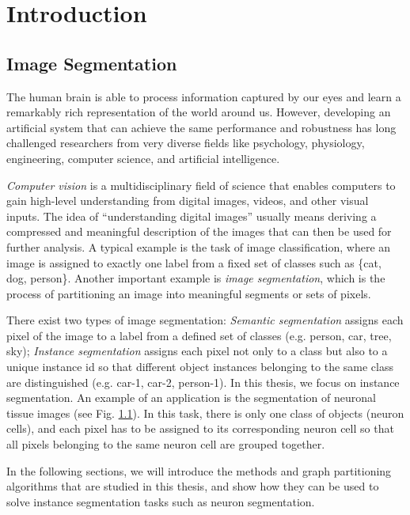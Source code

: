 
\chapter{Introduction}

\section{Image Segmentation}
The human brain is able to process information captured by our eyes and learn a remarkably rich representation of the world around us. However, developing an artificial system that can achieve the same performance and robustness has long challenged researchers from very diverse fields like psychology, physiology, engineering, computer science, and artificial intelligence.

\emph{Computer vision} is a multidisciplinary field of science that enables computers to gain high-level understanding from digital images, videos, and other visual inputs. 
The idea of ``understanding digital images'' usually means deriving a compressed and meaningful description of the images that can then be used for further analysis.
A typical example is the task of image classification, where an image is assigned to exactly one label from a fixed set of classes such as \{cat, dog, person\}. 
Another important example is \emph{image segmentation}, which is the process of partitioning an image into meaningful segments or sets of pixels. 

There exist two types of image segmentation: \emph{Semantic segmentation} assigns each pixel of the image to a label from a defined set of classes (e.g. person, car, tree, sky); \emph{Instance segmentation} assigns each pixel not only to a class but also to a unique instance id so that different object instances belonging to the same class are distinguished (e.g. car-1, car-2, person-1). 
In this thesis, we focus on instance segmentation. An example of an application is the segmentation of neuronal tissue images (see Fig. \ref{}). In this task, there is only one class of objects (neuron cells), and each pixel has to be assigned to its corresponding neuron cell so that all pixels belonging to the same neuron cell are grouped together. 

In the following sections, we will introduce the methods and graph partitioning algorithms that are studied in this thesis, and show how they can be used to solve instance segmentation tasks such as neuron segmentation.


